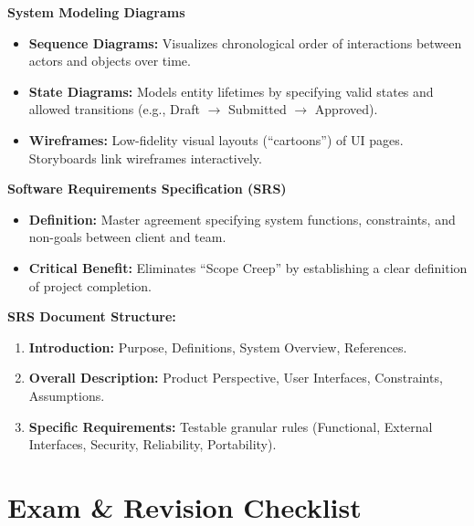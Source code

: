 \documentclass[8pt, a4paper]{article}
\begin{document}
\begin{conceptbox}
\textbf{System Modeling Diagrams}
\begin{itemize}
  \item \textbf{Sequence Diagrams:} Visualizes chronological order of interactions between actors and objects over time.
  \item \textbf{State Diagrams:} Models entity lifetimes by specifying valid states and allowed transitions (e.g., Draft $\to$ Submitted $\to$ Approved).
  \item \textbf{Wireframes:} Low-fidelity visual layouts (``cartoons'') of UI pages. Storyboards link wireframes interactively.
\end{itemize}
\end{conceptbox}

\begin{conceptbox}
\textbf{Software Requirements Specification (SRS)}
\begin{itemize}
  \item \textbf{Definition:} Master agreement specifying system functions, constraints, and non-goals between client and team.
  \item \textbf{Critical Benefit:} Eliminates ``Scope Creep'' by establishing a clear definition of project completion.
\end{itemize}

\medskip
\textbf{SRS Document Structure:}
\begin{enumerate}
  \item \textbf{Introduction:} Purpose, Definitions, System Overview, References.
  \item \textbf{Overall Description:} Product Perspective, User Interfaces, Constraints, Assumptions.
  \item \textbf{Specific Requirements:} Testable granular rules (Functional, External Interfaces, Security, Reliability, Portability).
\end{enumerate}
\end{conceptbox}

\section{Exam \& Revision Checklist}
\end{document}
